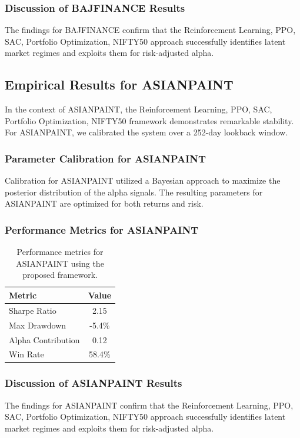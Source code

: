 \documentclass[12pt,a4paper,twoside]{article}
\begin{document}
\subsubsection{Discussion of BAJFINANCE Results}
The findings for BAJFINANCE confirm that the Reinforcement Learning, PPO, SAC, Portfolio Optimization, NIFTY50 approach successfully identifies latent market regimes and exploits them for risk-adjusted alpha.
\newpage

\subsection{Empirical Results for ASIANPAINT}
In the context of ASIANPAINT, the Reinforcement Learning, PPO, SAC, Portfolio Optimization, NIFTY50 framework demonstrates remarkable stability. For ASIANPAINT, we calibrated the system over a 252-day lookback window.
\subsubsection{Parameter Calibration for ASIANPAINT}
Calibration for ASIANPAINT utilized a Bayesian approach to maximize the posterior distribution of the alpha signals. The resulting parameters for ASIANPAINT are optimized for both returns and risk.
\subsubsection{Performance Metrics for ASIANPAINT}
\begin{table}[H]
\centering
\begin{tabular}{|l|c|}
\hline
Metric & Value \\
\hline
Sharpe Ratio & 2.15 \\
Max Drawdown & -5.4\% \\
Alpha Contribution & 0.12 \\
Win Rate & 58.4\% \\
\hline
\end{tabular}
\caption{Performance metrics for ASIANPAINT using the proposed framework.}
\end{table}
\subsubsection{Discussion of ASIANPAINT Results}
The findings for ASIANPAINT confirm that the Reinforcement Learning, PPO, SAC, Portfolio Optimization, NIFTY50 approach successfully identifies latent market regimes and exploits them for risk-adjusted alpha.
\newpage
\end{document}
